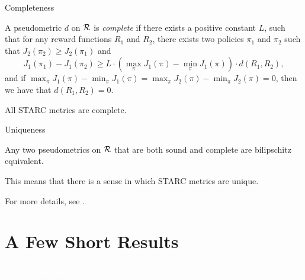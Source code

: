 \documentclass{beamer}
\begin{document}
\begin{frame}{Completeness}
    \small
    \begin{definition}\label{def:STARC_complete}
    A pseudometric $d$ on $\mathcal{R}$ is \emph{complete} if there exists a positive constant $L$, such that for any reward functions $R_1$ and $R_2$, there exists two policies $\pi_1$ and $\pi_2$ such that $J_2(\pi_2) \geq J_2(\pi_1)$ and
    $$
    J_1(\pi_1) - J_1(\pi_2) \geq L \cdot (\max_\pi J_1(\pi) - \min_\pi J_1(\pi)) \cdot d(R_1, R_2),
    $$
    and if $\max_\pi J_1(\pi) - \min_\pi J_1(\pi) = \max_\pi J_2(\pi) - \min_\pi J_2(\pi) = 0$, then we have that $d(R_1, R_2) = 0$.
    \end{definition}

    \begin{theorem}\label{thm:STARC_complete}
    All STARC metrics are complete.
    \end{theorem}
\end{frame}

\begin{frame}{Uniqueness}
    \small
    \begin{proposition}\label{prop:bilipschitz}
    Any two pseudometrics on $\mathcal{R}$ that are both sound and complete are bilipschitz equivalent.
    \end{proposition}

    \vspace{0.5cm}
    This means that there is a sense in which STARC metrics are unique.

    \vspace{0.5cm}
    For more details, see \citet{skalse2024starcgeneralframeworkquantifying}.
\end{frame}

\section{A Few Short Results}

\begin{frame}
    \frametitle{}
    \centering
    \Large
    \textcolor{white}{A Few Short Results}
\end{frame}
\end{document}

